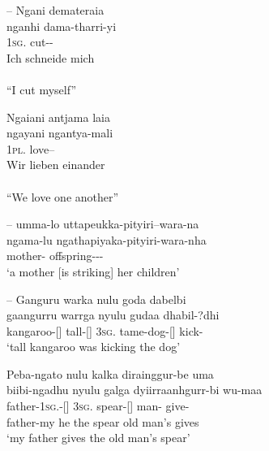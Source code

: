\documentclass{langscibook}
\begin{document}
--
\ea
\glll Ngani demateraia\\
nganhi dama-tharri-yi\\
1\textsc{sg}.   cut--\\
\glt Ich schneide mich \\
\citep[26]{flierl_dieri_1880} \\
“I cut myself”

\z

\ea
\glll Ngaiani {antjama laia}\\
ngayani ngantya-mali\\
1\textsc{pl}. love–\\
\glt Wir lieben einander \\ 
\citep[26]{flierl_dieri_1880} \\
“We love one another”
\z
    


--
\ea
 \glll umma-lo uttapeukka-pityiri–wara-na\\
 ngama-lu ngathapiyaka-pityiri-wara-nha\\
 mother-	offspring---\\
 \glt `a mother [is striking] her children' \citep[8]{roth_ethnological_1897}\\

\z




--
\ea\label{ex:key:2-13}\label{ex:2:13}
\glll Ganguru warka nulu goda dabelbi\\
gaangurru warrga nyulu gudaa dhabil-?dhi\\
kangaroo-[] tall-[] 3\textsc{sg}. tame-dog-[] kick-\\
\glt `tall kangaroo was kicking the dog' \\
\citep[23]{roth_structure_1901}
\z

\ea\label{ex:key:2-14}\label{ex:2:14}
\glll Peba-ngato nulu kalka dirainggur-be uma\\
biibi-ngadhu nyulu galga dyiirraanhgurr-bi wu-maa\\
father-1\textsc{sg}.-[] 3\textsc{sg}. spear-[] man- give-\\
\glt father-my he the spear old man’s gives\\
\glt `my father gives the old man’s spear' \\
\citep[29]{roth_structure_1901}
\z
\end{document}
